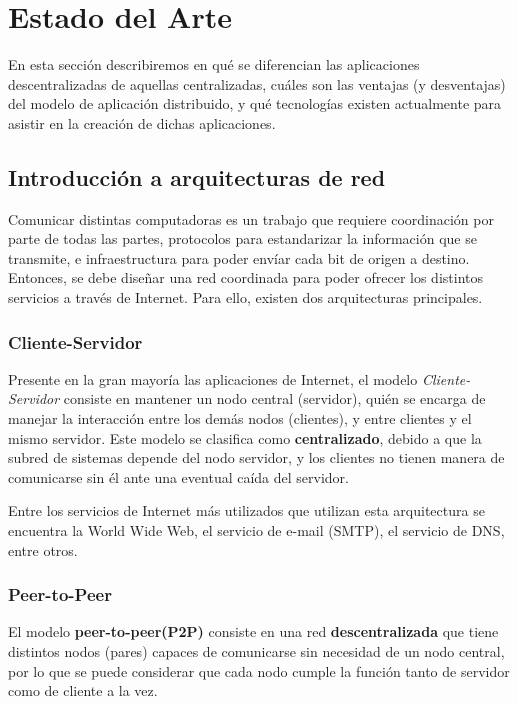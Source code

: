 \section{Estado del Arte}
En esta sección describiremos en qué se diferencian las aplicaciones descentralizadas de aquellas centralizadas, cuáles son las ventajas (y desventajas) del modelo de aplicación distribuido, y qué tecnologías existen actualmente para asistir en la creación de dichas aplicaciones. 

\subsection{Introducción a arquitecturas de red}
Comunicar distintas computadoras es un trabajo que requiere coordinación por parte de todas las partes, protocolos para estandarizar la información que se transmite, e infraestructura para poder envíar cada bit de origen a destino. Entonces, se debe diseñar una red coordinada para poder ofrecer los distintos servicios a través de Internet. Para ello, existen dos arquitecturas principales.

\subsubsection*{Cliente-Servidor}

Presente en la gran mayoría las aplicaciones de Internet, el modelo \textit{Cliente-Servidor} consiste en mantener un nodo central (servidor), quién se encarga de manejar la interacción entre los demás nodos (clientes), y entre clientes y el mismo servidor. Este modelo se clasifica como \textbf{centralizado}, debido a que la subred de sistemas depende del nodo servidor, y los clientes no tienen manera de comunicarse sin él ante una eventual caída del servidor.

Entre los servicios de Internet más utilizados que utilizan esta arquitectura se encuentra la World Wide Web, el servicio de e-mail (SMTP), el servicio de DNS, entre otros.

\subsubsection*{Peer-to-Peer}
El modelo \textbf{peer-to-peer(P2P)} consiste en una red \textbf{descentralizada} que tiene distintos nodos (pares) capaces de comunicarse sin necesidad de un nodo central, por lo que se puede considerar que cada nodo cumple la función tanto de servidor como de cliente a la vez.

